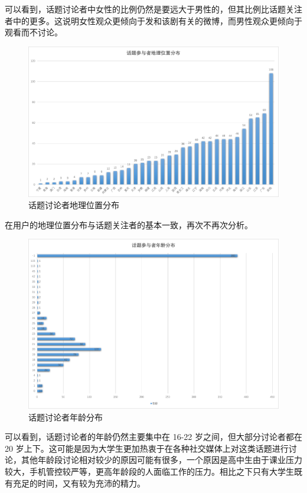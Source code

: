 \documentclass[a4paper,UTF8]{ctexart}
\begin{document}
可以看到，话题讨论者中女性的比例仍然是要远大于男性的，但其比例比话题关注者中的更多。这说明女性观众更倾向于发和该剧有关的微博，而男性观众更倾向于观看而不讨论。

\begin{figure}[htbp]
\centering
\includegraphics{img/participants_location.png}
\caption{话题讨论者地理位置分布}
\end{figure}

在用户的地理位置分布与话题关注者的基本一致，再次不再次分析。

\begin{figure}[htbp]
\centering
\includegraphics{img/participants_age.png}
\caption{话题讨论者年龄分布}
\end{figure}

可以看到，话题讨论者的年龄仍然主要集中在 16-22
岁之间，但大部分讨论者都在 20
岁上下。这可能是因为大学生更加热衷于在各种社交媒体上对这类话题进行讨论，其他年龄段讨论相对较少的原因可能有很多，一个原因是高中生由于课业压力较大，手机管控较严等，更高年龄段的人面临工作的压力。相比之下只有大学生既有充足的时间，又有较为充沛的精力。
\end{document}
